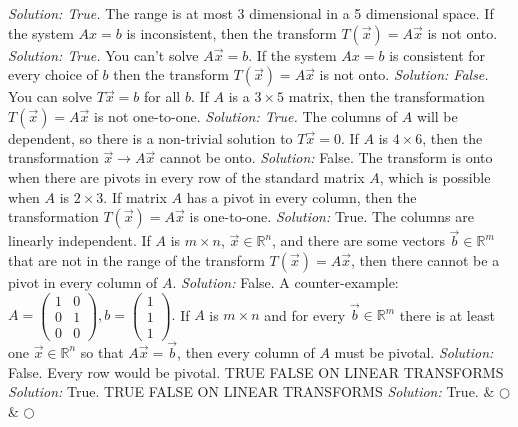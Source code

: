     \ifnum {} {\color{DarkBlue} \textit{Solution: True.} 
    The range is at most 3 dimensional in a 5 dimensional space.} \fi
\fi     
\ifnum {}
     If the system $Ax=b$ is inconsistent, then the transform $T(\vec x) = A\vec x$ is not onto. 
    \ifnum {} {\color{DarkBlue} \textit{Solution: True.  } 
    You can't solve $A\vec x = b$. } \fi
\fi     
\ifnum {}
    If the system $Ax=b$ is consistent for every choice of $b$ then the transform $T(\vec x) = A\vec x$ is not onto. 
    \ifnum {} {\color{DarkBlue} \textit{Solution: False.   } 
     You can solve $T \vec x =b$ for all $b$.}  \fi
\fi     
\ifnum {}
    If $A$ is a $3 \times 5$ matrix, then the transformation $T (\vec x)=A\vec x$ is not one-to-one. 
    \ifnum {} {\color{DarkBlue} \textit{Solution: True.} 
    The columns of $A$ will be dependent, so there is a non-trivial solution to $T \vec x =0$.}\fi
\fi     
\ifnum {}
 If $A$ is $4\times 6$, then the transformation $\vec x \to A\vec x$ cannot be onto. 
    \ifnum {} {\color{DarkBlue} \textit{Solution:  }  False. The transform is onto when there are pivots in every row of the standard matrix $A$, which is possible when $A$ is $2\times 3$. }  \fi
\fi     
\ifnum {}
    If matrix $A$ has a pivot in every column, then the transformation $T (\vec x) = A\vec x$ is one-to-one.  
    \ifnum {} {\color{DarkBlue} \textit{Solution:  }  
    True. The columns are linearly independent.} \fi
\fi   
\ifnum {}
    If $A$ is $m\times n$, $\vec x \in \mathbb R^n$, and there are some vectors $\vec b \in \mathbb R^m$ that are not in the range of the transform $T(\vec x) = A\vec x$, then there cannot be a pivot in every column of $A$. 
    \ifnum {} {\color{DarkBlue} \textit{Solution:  } False. A counter-example: \setlength{\extrarowheight}{0.0cm}$A=\begin{pmatrix} 1&0\\0&1\\0&0\end{pmatrix}, b = \begin{pmatrix} 1\\1\\1\end{pmatrix}$. } \fi
\fi   
\ifnum {}
    If $A$ is $m\times n$ and for every $\vec b \in \mathbb R^m$ there is at least one $\vec x \in \mathbb R^n$ so that $A \vec x = \vec b$, then every column of $A$ must be pivotal. 
    \ifnum {} {\color{DarkBlue} \textit{Solution:  }  False. Every row would be pivotal.} \fi
\fi   
\ifnum {}
    TRUE FALSE ON LINEAR TRANSFORMS
    \ifnum {} {\color{DarkBlue} \textit{Solution:  }  True. } \fi
\fi   
\ifnum {}
    TRUE FALSE ON LINEAR TRANSFORMS
    \ifnum {} {\color{DarkBlue} \textit{Solution:  }  True. } \fi
\fi   
& $\bigcirc$  & $\bigcirc$ \\   
